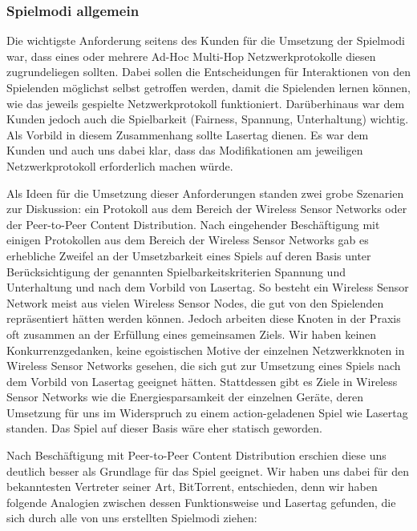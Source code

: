 \subsubsection{Spielmodi allgemein}
\label{sec:spielmodi-allgemein}

Die wichtigste Anforderung seitens des Kunden für die Umsetzung der Spielmodi war, dass eines oder mehrere Ad-Hoc Multi-Hop Netzwerkprotokolle diesen zugrundeliegen sollten. Dabei sollen die Entscheidungen für Interaktionen von den Spielenden möglichst selbst getroffen werden, damit die Spielenden lernen können, wie das jeweils gespielte Netzwerkprotokoll funktioniert. Darüberhinaus war dem Kunden jedoch auch die Spielbarkeit (Fairness, Spannung, Unterhaltung) wichtig. Als Vorbild in diesem Zusammenhang sollte Lasertag dienen. Es war dem Kunden und auch uns dabei klar, dass das Modifikationen am jeweiligen Netzwerkprotokoll erforderlich machen würde.

Als Ideen für die Umsetzung dieser Anforderungen standen zwei grobe Szenarien zur Diskussion: ein Protokoll aus dem Bereich der Wireless Sensor Networks oder der Peer-to-Peer Content Distribution. Nach eingehender Beschäftigung mit einigen Protokollen aus dem Bereich der Wireless Sensor Networks gab es erhebliche Zweifel an der Umsetzbarkeit eines Spiels auf deren Basis unter Berücksichtigung der genannten Spielbarkeitskriterien Spannung und Unterhaltung und nach dem Vorbild von Lasertag. So besteht ein Wireless Sensor Network meist aus vielen Wireless Sensor Nodes, die gut von den Spielenden repräsentiert hätten werden können. Jedoch arbeiten diese Knoten in der Praxis oft zusammen an der Erfüllung eines gemeinsamen Ziels. Wir haben keinen Konkurrenzgedanken, keine egoistischen Motive der einzelnen Netzwerkknoten in Wireless Sensor Networks gesehen, die sich gut zur Umsetzung eines Spiels nach dem Vorbild von Lasertag geeignet hätten. Stattdessen gibt es Ziele in Wireless Sensor Networks wie die Energiesparsamkeit der einzelnen Geräte, deren Umsetzung für uns im Widerspruch zu einem action-geladenen Spiel wie Lasertag standen. Das Spiel auf dieser Basis wäre eher statisch geworden.

Nach Beschäftigung mit Peer-to-Peer Content Distribution erschien diese uns deutlich besser als Grundlage für das Spiel geeignet. Wir haben uns dabei für den bekanntesten Vertreter seiner Art, BitTorrent, entschieden, denn wir haben folgende Analogien zwischen dessen Funktionsweise und Lasertag gefunden, die sich durch alle von uns erstellten Spielmodi ziehen:

